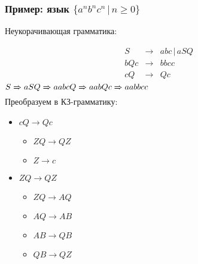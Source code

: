 \documentclass{beamer}
\newcommand{\derives}[0]{\xRightarrow[]{}}
\begin{document}
\begin{frame}[fragile]
  \transwipe[direction=90]
  \frametitle{Пример: язык $\{ a^n b^n c^n \, | \, n \geq 0 \}$}
  Неукорачивающая грамматика: 
  
$$
\begin{array}{crcl}
&S& \rightarrow & abc \, | \, a S Q \\
&bQc& \rightarrow & bbcc  \\
&cQ& \rightarrow & Qc 
\end{array}
$$   
\pause
$S \derives a S Q \derives a a b c Q \derives aabQc \derives aabbcc$
\pause
~\\

Преобразуем в КЗ-грамматику: \pause

\begin{itemize}
  \item $c Q \rightarrow Q c$
  \begin{itemize}
    \item $Z Q \rightarrow Q Z$
    \item $Z \rightarrow c$
  \end{itemize} \pause
  \item $Z Q \rightarrow Q Z$
  \begin{itemize}
    \item $Z Q \rightarrow A Q$
    \item $A Q \rightarrow A B$
    \item $A B \rightarrow Q B$
    \item $Q B \rightarrow Q Z$
  \end{itemize}
\end{itemize}
\end{frame}
\end{document}
